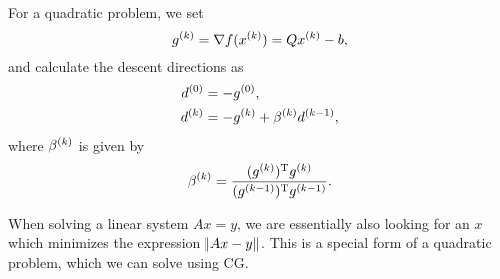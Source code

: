 \documentclass{article}
\begin{document}
For a quadratic problem, we set
\begin{equation*}
  \kth{g} = \nabla f(\kth{x}) = Q \kth{x} - b,
\end{equation*}
and calculate the descent directions as
\begin{align*}
  \kth[0]{d} &= -\kth[0]{g}, \\
  \kth[k]{d} &= -\kth{g} + \kth{\beta}\kth[k-1]{d},
\end{align*}
where \(\kth{\beta}\) is given by
\begin{equation*}
  \kth{\beta} = \frac{\T{(\kth{g})}\kth{g}}{\T{(\kth[k-1]{g})}\kth[k-1]{g}}.
\end{equation*}


When solving a linear system \(Ax = y\), we are essentially also looking for an \(x\) which
minimizes the expression \(\enVert{Ax - y}\).  This is a special form of a quadratic problem, which
we can solve using CG.
\end{document}
